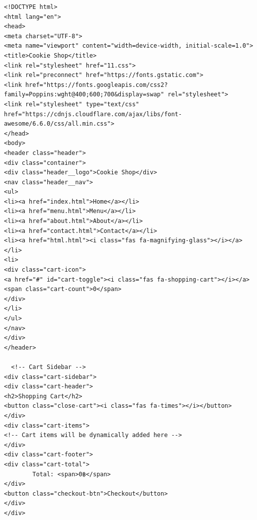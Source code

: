 \documentclass{report}
\begin{document}
\begin{verbatim}
<!DOCTYPE html>
<html lang="en">
<head>
<meta charset="UTF-8">
<meta name="viewport" content="width=device-width, initial-scale=1.0">
<title>Cookie Shop</title>
<link rel="stylesheet" href="11.css">
<link rel="preconnect" href="https://fonts.gstatic.com">
<link href="https://fonts.googleapis.com/css2?family=Poppins:wght@400;600;700&display=swap" rel="stylesheet">
<link rel="stylesheet" type="text/css" href="https://cdnjs.cloudflare.com/ajax/libs/font-awesome/6.6.0/css/all.min.css">
</head>
<body>
<header class="header">
<div class="container">
<div class="header__logo">Cookie Shop</div>
<nav class="header__nav">
<ul>
<li><a href="index.html">Home</a></li>
<li><a href="menu.html">Menu</a></li>
<li><a href="about.html">About</a></li>
<li><a href="contact.html">Contact</a></li>
<li><a href="html.html"><i class="fas fa-magnifying-glass"></i></a></li>
<li>
<div class="cart-icon">
<a href="#" id="cart-toggle"><i class="fas fa-shopping-cart"></i></a>
<span class="cart-count">0</span>
</div>
</li>
</ul>
</nav>
</div>
</header>
 
  <!-- Cart Sidebar -->
<div class="cart-sidebar">
<div class="cart-header">
<h2>Shopping Cart</h2>
<button class="close-cart"><i class="fas fa-times"></i></button>
</div>
<div class="cart-items">
<!-- Cart items will be dynamically added here -->
</div>
<div class="cart-footer">
<div class="cart-total">
        Total: <span>0฿</span>
</div>
<button class="checkout-btn">Checkout</button>
</div>
</div>
 

\end{verbatim}
\end{document}
